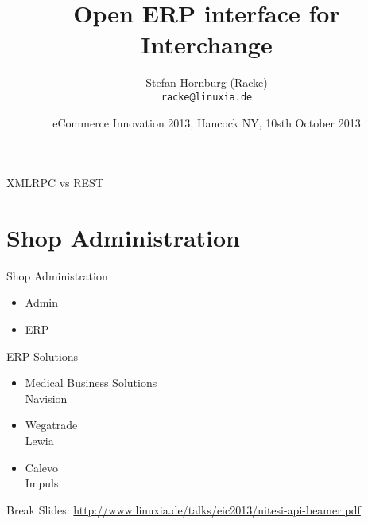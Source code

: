 \usepackage[utf8]{inputenc}
\usepackage[T1]{fontenc}
\usepackage{mathptmx}
\usepackage[scaled=.90]{helvet}
\usepackage{courier}
\usepackage{caption}
\captionsetup{labelformat=empty,labelsep=none}
\usepackage{beamerthemesplit}
\usepackage{verbatim}
\usepackage{hyperref}
\usepackage{listings}
\lstset{language=Perl,basicstyle=\normalsize,tabsize=3,showstringspaces=false}

\title{Open ERP interface for Interchange}
\author[racke]{Stefan Hornburg (Racke)\\ \texttt{racke@linuxia.de}}
\date{eCommerce Innovation 2013, Hancock NY, 10sth October 2013}


\maketitle{}

\begin{frame}
  \titlepage
\end{frame}

\tableofcontents

XMLRPC vs REST

\section{Shop Administration}

\begin{frame}{Shop Administration}
\begin{itemize}
\item Admin
\item ERP
\end{itemize}
\end{frame}

\begin{frame}{ERP Solutions}
\begin{itemize}
\item Medical Business Solutions \\
      Navision
\item Wegatrade \\
      Lewia
\item Calevo \\
      Impuls
\end{itemize}
\end{frame}

\begin{frame}{Break}
Slides:
\url{http://www.linuxia.de/talks/eic2013/nitesi-api-beamer.pdf}
\end{frame}



